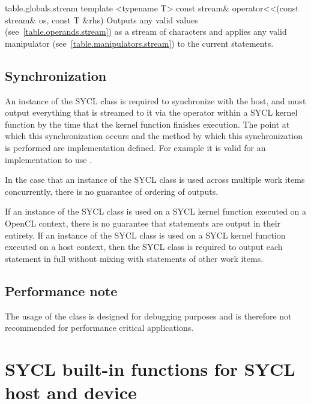 {table.globals.stream}
  \addRow
    {template <typename T> const stream\& operator<<(const stream\& os, const T \&rhs)}
    {
      Outputs any valid values (see~\ref{table.operands.stream}) as a stream of characters and applies any valid manipulator (see~\ref{table.manipulators.stream}) to the current statements.
    }
\completeTable

\subsection{Synchronization}

An instance of the SYCL  class is required to synchronize with the host, and must output everything that is streamed to it via the  operator within a SYCL kernel function by the time that the kernel function finishes execution. The point at which this synchronization occurs and the method by which this synchronization is performed are implementation defined. For example it is valid for an implementation to use .

In the case that an instance of the SYCL  class is used across multiple work items concurrently, there is no guarantee of ordering of outputs.

If an instance of the SYCL  class is used on a SYCL kernel function executed on a OpenCL context, there is no guarantee that statements are output in their entirety. If an instance of the SYCL  class is used on a SYCL kernel function executed on a host context, then the SYCL  class is required to output each statement in full without mixing with statements of other work items.

\subsection{Performance note}

The usage of the  class is designed for debugging purposes and is therefore not recommended for performance critical applications.

\section{SYCL built-in functions for SYCL host and device}
\label{sycl:builtins}



